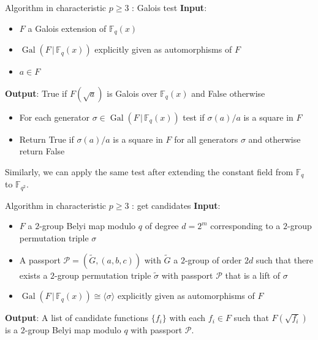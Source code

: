 \documentclass[xcolor=dvipsnames]{beamer}
\theoremstyle{plain}
\newcommand{\wt}[1]{\widetilde{#1}}
\newcommand{\FF}{\mathbb{F}}
\DeclareMathOperator{\Gal}{Gal}
\begin{document}
  \begin{frame}{Algorithm in characteristic $p\geq 3$ : Galois test}
    \textbf{Input}:
    \begin{itemize}
      \item
        $F$ a Galois extension of $\FF_q(x)$
      \item
        $\Gal(F\,|\,\FF_q(x))$ explicitly given as automorphisms of $F$
      \item
        $a\in F$
    \end{itemize}
    \textbf{Output}:
    True if $F(\sqrt{a})$ is Galois over $\FF_q(x)$
    and False otherwise
    \par
    \begin{itemize}
      \item
        For each generator $\sigma\in\Gal(F\,|\,\FF_q(x))$
        test if $\sigma(a)/a$ is a square in $F$
      \item
        Return True if $\sigma(a)/a$ is a square in $F$
        for all generators $\sigma$
        and otherwise return False
    \end{itemize}
    \par
    Similarly, we can apply the same test after
    extending the constant field from $\FF_q$
    to $\FF_{q^2}$.
  \end{frame}
  \begin{frame}{Algorithm in characteristic $p\geq 3$ : get candidates}
    \textbf{Input}:
    \begin{itemize}
      \item 
        $F$
        a $2$-group Belyi map modulo $q$
        of degree $d=2^m$
        corresponding to a $2$-group
        permutation triple $\sigma$
      \item
        A passport
        $\mathcal{P}=(\wt{G},(a,b,c))$
        with $\wt{G}$ a $2$-group of order
        $2d$ such that there
        exists a
        $2$-group permutation triple
        $\wt{\sigma}$ with passport
        $\mathcal{P}$
        that is a lift of
        $\sigma$
      \item
        $\Gal(F\,|\,\FF_q(x))\cong
        \langle\sigma\rangle$
        explicitly given
        as automorphisms of $F$
    \end{itemize}
    \textbf{Output}:
    A list of candidate functions
    $\{f_i\}$ with each $f_i\in F$
    such that $F(\sqrt{f_i})$ is a
    $2$-group Belyi map modulo $q$
    with passport $\mathcal{P}$.
  \end{frame}
\end{document}
